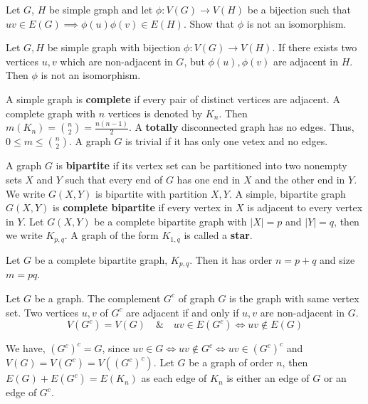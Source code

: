 \begin{exercise}
	Let $G$, $H$ be simple graph and let $\phi : V(G) \to V(H)$ be a bijection such that $uv \in E(G) \implies \phi(u)\phi(v) \in E(H)$. Show that $\phi$ is not an isomorphism.
\end{exercise}
	Let $G,H$ be simple graph with bijection $\phi : V(G) \to V(H)$.
	If there exists two vertices $u,v$ which are non-adjacent in $G$, but $\phi(u),\phi(v)$ are adjacent in $H$.
	Then $\phi$ is not an isomorphism.

\begin{definition}
	A simple graph is \textbf{complete} if every pair of distinct vertices are adjacent.
	A complete graph with $n$ vertices is denoted by $K_n$.
	Then $m(K_n) = \binom{n}{2} = \frac{n(n-1)}{2}$.
	A \textbf{totally} disconnected graph has no edges.
	Thus, $0 \le m \le \binom{n}{2}$.
	A graph $G$ is trivial if it has only one vetex and no edges.
\end{definition}

\begin{definition}
	A graph $G$ is \textbf{bipartite} if its vertex set can be partitioned into two nonempty sets $X$ and $Y$ such that every end of $G$ has one end in $X$ and the other end in $Y$. We write $G(X,Y)$ is bipartite with partition $X,Y$.
	A simple, bipartite graph $G(X,Y)$ is \textbf{complete bipartite} if every vertex in $X$ is adjacent to every vertex in $Y$. Let $G(X,Y)$ be a complete bipartite graph with $|X| = p$ and $|Y|=q$, then we write $K_{p,q}$. A graph of the form $K_{1,q}$ is called a \textbf{star}.
\end{definition}

\begin{remark}
	Let $G$ be a complete bipartite graph, $K_{p,q}$.
	Then it has order $n = p+q$ and size $m = pq$.
\end{remark}

\begin{definition}
Let $G$ be a graph. The complement $G^c$ of graph $G$ is the graph with same vertex set. Two vertices $u,v$ of $G^c$ are adjacent if and only if $u,v$ are non-adjacent in $G$.
	$$ V(G^c) = V(G) \quad \& \quad uv \in E(G^c) \iff uv \notin E(G) $$
\end{definition}
\begin{remark}
	We have, $(G^c)^c = G$, since ${uv \in G \iff uv \notin G^c \iff uv \in (G^c)^c}$ and $V(G) = V(G^c) = V((G^c)^c)$.
	Let $G$ be a graph of order $n$, then $E(G) + E(G^c) = E(K_n)$ as each edge of $K_n$ is either an edge of $G$ or an edge of $G^c$.
\end{remark}

